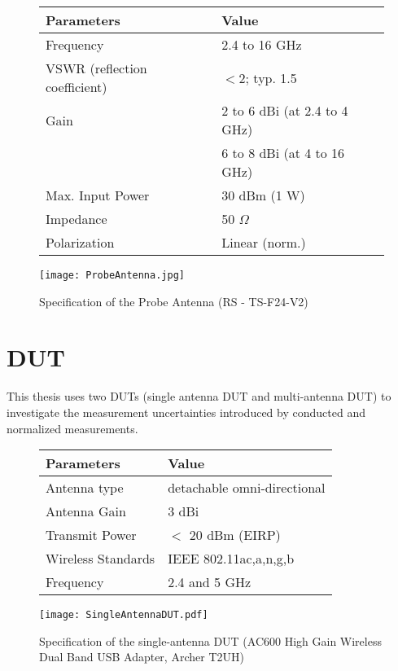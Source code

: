 \begin{figure}[h]
    \begin{minipage}[c]{.7\textwidth}%
        \begin {tabular} {|l|l|} 
\toprule
Parameters & Value \\ 
\midrule 
Frequency & 2.4 to 16 GHz \\
VSWR (reflection coefficient) & $<$2; typ. 1.5 \\
Gain & 2 to 6 dBi (at 2.4 to 4 GHz)\\ 
 & 6 to 8 dBi (at 4 to 16 GHz)\\ 
Max. Input Power & 30 dBm (1 W) \\
Impedance & 50 $\Omega$ \\
Polarization & Linear (norm.)\\
\bottomrule
\end {tabular}    \end{minipage}
    \hfill
    \begin{minipage}[c]{.2\textwidth}
        \texttt{[image: ProbeAntenna.jpg]}
    \end{minipage}
    \caption{Specification of the Probe Antenna (\acs{RS}\textregistered{} - TS-F24-V2) \cite{ts7124}}
\label{fig:probes}
\end{figure}      

\section{\ac{DUT}}
This thesis uses two \acsp{DUT} (single antenna \acs{DUT} and multi-antenna \acs{DUT}) to investigate the measurement uncertainties introduced by conducted and normalized measurements. 

\begin{figure}[h]
    \begin{minipage}[c]{.7\textwidth}%
        \begin {tabular} {|l|l|} 
\toprule
Parameters & Value \\ 
\midrule 
Antenna type & detachable omni-directional \\
Antenna Gain & 3 dBi \\
Transmit Power & $<$ 20 dBm (\acs{EIRP})\\ 
Wireless Standards & \acs{IEEE} 802.11ac,a,n,g,b \\
Frequency & 2.4 and 5 GHz \\
\bottomrule
\end {tabular}    \end{minipage}
    \hfill
    \begin{minipage}[c]{.28\textwidth}
        \texttt{[image: SingleAntennaDUT.pdf]}
    \end{minipage}
    \caption{Specification of the single-antenna \acs{DUT} (AC600 High Gain Wireless Dual Band USB Adapter, Archer T2UH) \cite{tplinksingle}}
\label{fig:singleAntennaDUT}
\end{figure}     

